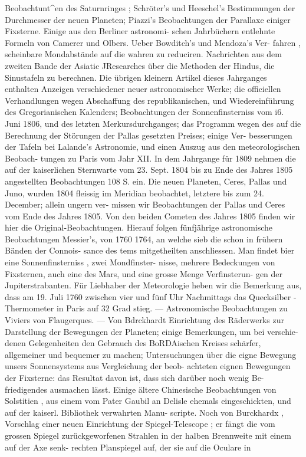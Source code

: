 \documentclass[12pt,a4paper]{article}
\begin{document}
Beobachtunt\textasciicircum{}en  des  Saturnringes ;  Schröter's  und  Heeschel's  Bestimmungen  der  Durchmesser  der  neuen Planeten;  Piazzi's  Beobachtungen  der  Parallaxe  einiger  Fixsterne.  Einige  aus  den  Berliner  astronomi- schen Jahrbüchern  entlehnte  Formeln  von  Camerer  und  Olbers.  Ueber  Bowditch's  und  Mendoza's  Ver- fahren ,  scheinbare  Mondabstände  auf  die  wahren  zu  reduciren.  Nachrichten  aus  dem  zweiten  Bande  der Asiatic  JResearches  über  die  Methoden  der  Hindus,  die  Sinustafeln  zu  berechnen.  Die  übrigen  kleinern Artikel  dieses  Jahrganges  enthalten  Anzeigen  verschiedener  neuer  astronomischer  Werke;  die  officiellen Verhandlungen  wegen  Abschaffung  des  republikanischen,  und  Wiedereinführung  des  Gregorianischen Kalenders;  Beobachtungen  der  Sonnenfinsterniss  vom  i6.  Juni  1806,  und  des  letzten  Merkursdurchganges; das  Programm  wegen  des  auf  die  Berechnung  der  Störungen  der  Pallas  gesetzten  Preises;  einige  Ver- besserungen der  Tafeln  bei  Lalande's  Astronomie,  und  einen  Auszug  aus  den  meteorologischen  Beobach- tungen zu  Paris  vom  Jahr  XII. In  dem  Jahrgange  für  1809  nehmen  die  auf  der  kaiserlichen  Sternwarte  vom  23.  Sept.  1804  bis  zu Ende  des  Jahres  1805  angestellten  Beobachtungen  108  S.  ein.  Die  neuen  Planeten,  Ceres,  Pallas  und Juno,  wurden  1804  fleissig  im  Meridian  beobachtet,  letztere  bis  zum  24.  December;  allein  ungern  ver- missen wir  Beobachtungen  der  Pallas  und  Ceres  vom  Ende  des  Jahres  1805.  Von  den  beiden  Cometen des  Jahres  1805  finden  wir  hier  die  Original-Beobachtungen.      Hierauf   folgen   fünfjährige  astronomische Beobachtungen  Messier's,  von  1760   1764,    an  welche  sieb  die  schon  in  frühern  Bänden  der  Connois- sance  des  tems  mitgetheilten  anschliessen.  Man  findet  bier  eine  Sonnenfinsterniss ,  zwei  Mondfinster- nisse,  mehrere  Bedeckungen  von  Fixsternen,  auch  eine  des  Mars,  und  eine  grosse  Menge  Verfinsterun- gen der  Jupiterstrabanten.  Für  Liebhaber  der  Meteorologie  heben  wir  die  Bemerkung  aus,  dass  am  19. Juli  1760  zwischen  vier  und  fünf  Uhr  Nachmittags  das  Quecksilber -Thermometer  in  Paris  auf  32  Grad stieg.  ---  Astronomische  Beobachtungen  zu  Viviers  von  Flaugerques.  ---  Von  Bdrckhardt  Einrichtung des  Räderwerks  zur  Darstellung  der  Bewegungen  der  Planeten;  einige  Bemerkungen,  um  bei  verschie- denen Gelegenheiten  den  Gebrauch  des  BoRDAischen  Kreises  schärfer,  allgemeiner  und  bequemer  zu machen;  Untersuchungen  über  die  eigne  Bewegung  unsers  Sonnensystems  aus  Vergleichung  der  beob- achteten eignen  Bewegungen  der  Fixsterne:  das  Resultat  davon  ist,  dass  sich  darüber  noch  wenig  Be- friedigendes ausmachen  lässt.  Einige  ältere  Chinesische  Beobachtungen  von  Solstitien ,  aus  einem  vom Pater  Gaubil  an  Delisle  ehemals  eingeschickten,  und  auf  der  kaiserl.  Bibliothek  verwahrten  Manu- scripte.  Noch  von  Burckhardx  ,  Vorschlag  einer  neuen  Einrichtung  der  Spiegel-Telescope ;  er  fängt  die vom  grossen  Spiegel  zurückgeworfenen  Strahlen  in  der  halben  Brennweite  mit  einem  auf  der  Axe  senk- rechten Planspiegel  auf,  der  sie  auf  die  Oculare  in  
\end{document}
